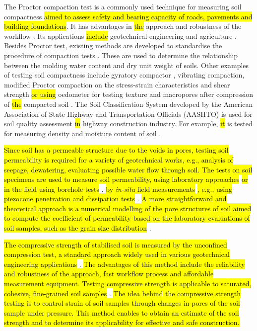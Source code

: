 \documentclass{amestyle}
\begin{document}
The Proctor compaction test is a commonly used technique for measuring soil compactness \hl{aimed to assess safety and bearing capacity of roads, pavements and building foundations}. It has advantages in \hl{the} approach and robustness of the workflow\hl{ }\cite{Wasman,Matteo,Boudlal}. Its applications \hl{include} geotechnical engineering \cite{Barden,Jibon} and agriculture \cite{ARAGON2000197,Bayat,Nhantumbo,ALAOUI20111}. Besides Proctor test, existing methods are developed to standardise the procedure of compaction tests\hl{ }\cite{ASTM2007,ASTM2009}. These are used to determine the relationship between the molding water content and dry unit weight of soils. Other examples of testing soil compactness include\hl{ }gyratory compactor \cite{Leeetal2007}, vibrating compaction, modified Proctor compaction on the stress-strain characteristics and shear strength \cite{Long} \hl{or using} oedometer for testing texture and macropores after\hl{ }compression of \hl{the} compacted soil \cite{Alaoui}. The Soil Classification System developed by the American Association of State Highway and Transportation Officials (AASHTO) is used\hl{ }for soil quality assessment \hl{in} highway construction industry. For example, \hl{it} is tested for measuring density and\hl{ }moisture content of\hl{ }soil \cite{Livneh}. 

\hl{Since soil has a permeable structure due to the voids in pores, testing soil permeability is required for a variety of geotechnical works, e.g., analysis of seepage, dewatering, evaluating possible water flow through soil. The tests on soil specimens are used to measure soil permeability, using laboratory approaches} \cite{ELHAKIM20162631} \hl{or in the field using borehole tests} \cite{YU2022127817}, \hl{by \emph{in-situ} field measurements} \cite{ZHOU201999}\hl{, e.g., using piezocone penetration and dissipation tests} \cite{TAKAI2016277,LIM2019189}. \hl{A more straightforward and theoretical approach is a numerical modelling of the pore structures of soil aimed to compute the coefficient of permeability based on the laboratory evaluations of soil samples, such as the grain size distribution} \cite{LIU2021104468}.

\hl{The compressive strength of stabilised soil is measured by the unconfined compression test, a standard approach widely used in various geotechnical engineering applications} \cite{SHIBI20211123,KARDANI2021100591}. \hl{The advantages of this method include the reliability and robustness of the approach, fast workflow process and affordable measurement equipment. Testing compressive strength is applicable to saturated, cohesive, fine-grained soil samples} \cite{MOUSAVI2021104890,AHMED201527}. \hl{The idea behind the compressive strength testing is to control strain of soil samples through changes in pores of the soil sample under pressure. This method enables to obtain an estimate of the soil strength and to determine its applicability for effective and safe construction.}
\end{document}

